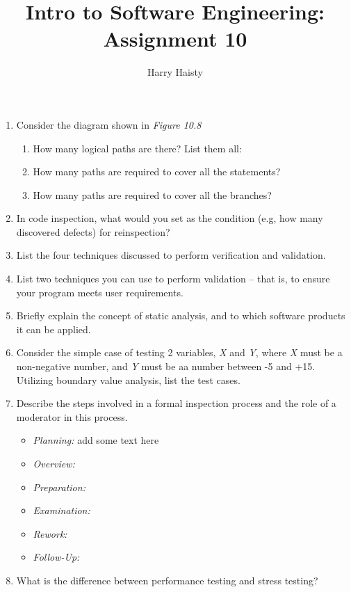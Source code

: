 \documentclass[11pt]{article}
\title{Intro to Software Engineering: Assignment 10}
\author{Harry Haisty}
\begin{document}
    \maketitle
    \begin{enumerate}
        \item Consider the diagram shown in \textit{Figure 10.8}
        \begin{enumerate}
        \item How many logical paths are there? List them all:
        
        \item How many paths are required to cover all the statements?
        
        \item How many paths are required to cover all the branches?
        \end{enumerate}
        
        \item In code inspection, what would you set as the condition (e.g, how many discovered defects) for reinspection?
        
        \item List the four techniques discussed to perform verification and validation.
        
        \item List two techniques you can use to perform validation -- that is, to ensure your program meets user requirements. 
        
        \item Briefly explain the concept of static analysis, and to which software products it can be applied.
        
        \item Consider the simple case of testing 2 variables, \textit{X} and \textit{Y}, where \textit{X} must be a non-negative number, and \textit{Y} must be aa number between -5 and +15. Utilizing boundary value analysis, list the test cases. 
        
        \item Describe the steps involved in a formal inspection process and the role of a moderator in this process.
        \begin{itemize}
        \item \textit{Planning: } add some text here
        \item \textit{Overview: } %
        \item \textit{Preparation: } %
        \item \textit{Examination: } %
        \item \textit{Rework: }
        \item \textit{Follow-Up: } 
        \end{itemize}
        
        \item What is the difference between performance testing and stress testing? 
        
        
    \end{enumerate}
    
    
\end{document}

